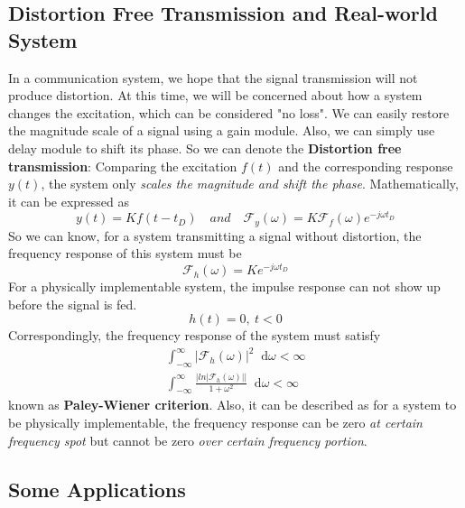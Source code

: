 \documentclass[margin,line]{res}
\newcommand*{\dif}{\mathop{}\!\mathrm{d}}
\begin{document}
\begin{resume}
\subsection{\textbf{Distortion Free Transmission and Real-world System}}
In a communication system, we hope that the signal transmission will not produce distortion. At this time, we will be concerned about how a system changes the excitation, which can be considered "no loss". We can easily restore the magnitude scale of a signal using a gain module. Also, we can simply use delay module to shift its phase. So we can denote the \textbf{Distortion free transmission}: Comparing the excitation $f(t)$ and the corresponding response $y(t)$, the system only \textit{scales the magnitude and shift the phase}. Mathematically, it can be expressed as
$$
y(t) = Kf(t-t_D) \quad and \quad \mathscr{F}_y(\omega) = K\mathscr{F}_f(\omega)e^{-j\omega t_D}
$$
So we can know, for a system transmitting a signal without distortion, the frequency response of this system must be
$$
\mathscr{F}_h(\omega) = Ke^{-j\omega t_D}
$$
For a physically implementable system, the impulse response can not show up before the signal is fed.
$$
h(t) =0, \ t < 0
$$
Correspondingly, the frequency response of the system must satisfy
\begin{align}
\int_{-\infty}^{\infty} \left|\mathscr{F}_h(\omega)\right|^2 \dif \omega < \infty \nonumber \\ 
\int_{-\infty}^{\infty} \frac{\left| ln \left| \mathscr{F}_h(\omega) \right| \right|}{1+\omega^2} \dif \omega < \infty \nonumber
\end{align}
known as \textbf{Paley-Wiener criterion}. Also, it can be described as for a system to be physically implementable, the frequency response can be zero \textit{at certain frequency spot} but cannot be zero \textit{over certain frequency portion}.
\subsection{\textbf{Some Applications}}

\end{resume}
\end{document}

